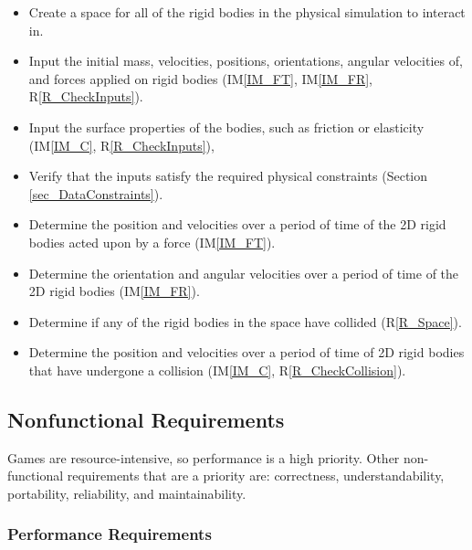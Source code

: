 \documentclass[12pt]{article}
\newcommand{\iref}[1]{IM\ref{#1}}
\newcounter{reqnum} %
\newcommand{\rref}[1]{R\ref{#1}}
\begin{document}
\noindent
\begin{itemize}

\item[R\refstepcounter{reqnum}\thereqnum \label{R_Space}:] Create a space for all of the rigid bodies in the physical simulation 
to interact in.  
\item[R\refstepcounter{reqnum}\thereqnum \label{R_Rigid}:] Input the initial mass, velocities, positions, orientations, angular velocities of, and forces applied on rigid bodies (\iref{IM_FT}, \iref{IM_FR}, \rref{R_CheckInputs}).
\item[R\refstepcounter{reqnum}\thereqnum \label{R_Shape}:] Input the surface properties of the bodies, such as friction or elasticity (\iref{IM_C}, \rref{R_CheckInputs}),
\item[R\refstepcounter{reqnum}\thereqnum \label{R_CheckInputs}:] Verify that the inputs satisfy the required physical constraints (Section \ref{sec_DataConstraints}).
\item[R\refstepcounter{reqnum}\thereqnum \label{R_Force}:] Determine the position and velocities over a period of time of the 2D
rigid bodies acted upon by a force (\iref{IM_FT}).
\item[R\refstepcounter{reqnum}\thereqnum \label{R_Rotation}:] Determine the orientation and angular velocities over a period of time of
the 2D rigid bodies (\iref{IM_FR}).
\item[R\refstepcounter{reqnum}\thereqnum \label{R_CheckCollision}:] Determine if any of the rigid bodies in the space have collided (\rref{R_Space}).
\item[R\refstepcounter{reqnum}\thereqnum \label{R_Collision}:] Determine the position and velocities over a period of time of 2D rigid
bodies that have undergone a collision (\iref{IM_C}, \rref{R_CheckCollision}).

\end{itemize} 

\subsection{Nonfunctional Requirements}
Games are resource-intensive, so performance is a high priority.
Other non-functional requirements that are a priority are: correctness,
understandability, portability, reliability, and maintainability. 

\subsubsection{Performance Requirements}
\end{document}
